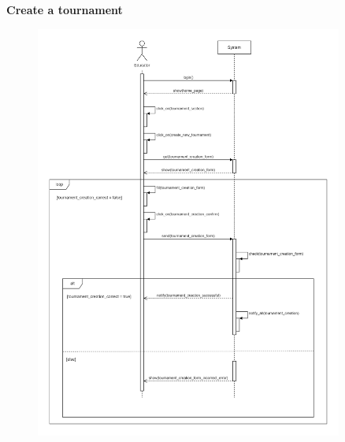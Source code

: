 \documentclass[../RASD.tex]{subfiles}
\begin{document}
    \textbf{Create a tournament}
    \begin{figure}[h!]
        \centering
        \includegraphics[width=0.9\textwidth]{../assets/section_3/CreateATournamentDiagram.png}
    \end{figure}
    \newpage
\end{document}
